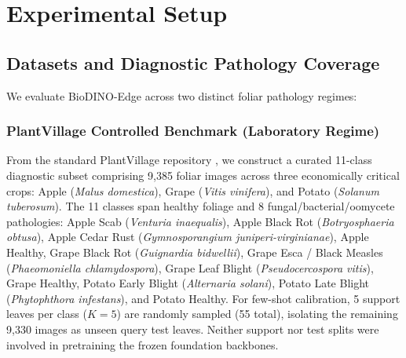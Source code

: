 \documentclass[preprint,12pt]{elsarticle}
\begin{document}
\section{Experimental Setup}
\label{sec:experiments_setup}

\subsection{Datasets and Diagnostic Pathology Coverage}
\label{sec:datasets}
We evaluate BioDINO-Edge across two distinct foliar pathology regimes:

\subsubsection{PlantVillage Controlled Benchmark (Laboratory Regime)}
From the standard PlantVillage repository \cite{hughes2012plantvillage}, we construct a curated 11-class diagnostic subset comprising 9,385 foliar images across three economically critical crops: Apple (\textit{Malus domestica}), Grape (\textit{Vitis vinifera}), and Potato (\textit{Solanum tuberosum}). The 11 classes span healthy foliage and 8 fungal/bacterial/oomycete pathologies: Apple Scab (\textit{Venturia inaequalis}), Apple Black Rot (\textit{Botryosphaeria obtusa}), Apple Cedar Rust (\textit{Gymnosporangium juniperi-virginianae}), Apple Healthy, Grape Black Rot (\textit{Guignardia bidwellii}), Grape Esca / Black Measles (\textit{Phaeomoniella chlamydospora}), Grape Leaf Blight (\textit{Pseudocercospora vitis}), Grape Healthy, Potato Early Blight (\textit{Alternaria solani}), Potato Late Blight (\textit{Phytophthora infestans}), and Potato Healthy. For few-shot calibration, 5 support leaves per class ($K=5$) are randomly sampled (55 total), isolating the remaining 9,330 images as unseen query test leaves. Neither support nor test splits were involved in pretraining the frozen foundation backbones.
\end{document}
